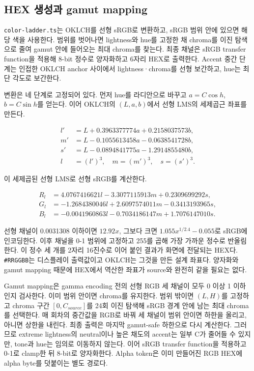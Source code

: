 \documentclass[11pt,titlepage]{article}
\begin{document}
\setlength{\tabcolsep}{6pt}
\normalsize

\subsection{HEX 생성과 gamut mapping}

\texttt{color-ladder.ts}는 OKLCH를 선형 sRGB로 변환하고, sRGB 범위 안에 있으면 해당 색을 사용한다. 범위를 벗어나면 lightness와 hue를 고정한 채 chroma를 이진 탐색으로 줄여 gamut 안에 들어오는 최대 chroma를 찾는다. 최종 채널은 sRGB transfer function을 적용해 8-bit 정수로 양자화하고 6자리 HEX로 출력한다. Accent 중간 단계는 인접한 OKLCH anchor 사이에서 lightness·chroma를 선형 보간하고, hue는 최단 각도로 보간한다\cite{ladder}.

변환은 네 단계로 고정되어 있다. 먼저 hue를 라디안으로 바꾸고 \(a=C\cos h\), \(b=C\sin h\)를 얻는다. 이어 OKLCH의 \((L,a,b)\)에서 선형 LMS의 세제곱근 좌표를 만든다.

\begin{align*}
l' &= L + 0.3963377774a + 0.2158037573b,\\
m' &= L - 0.1055613458a - 0.0638541728b,\\
s' &= L - 0.0894841775a - 1.2914855480b,\\
l &= (l')^3, \quad m=(m')^3, \quad s=(s')^3.
\end{align*}

이 세제곱된 선형 LMS로 선형 sRGB를 계산한다.

\begin{align*}
R_l &= 4.0767416621l - 3.3077115913m + 0.2309699292s,\\
G_l &= -1.2684380046l + 2.6097574011m - 0.3413193965s,\\
B_l &= -0.0041960863l - 0.7034186147m + 1.7076147010s.
\end{align*}

선형 채널이 0.0031308 이하이면 \(12.92x\), 그보다 크면 \(1.055x^{1/2.4}-0.055\)로 sRGB에 인코딩한다. 이후 채널을 0-1 범위에 고정하고 255를 곱해 가장 가까운 정수로 반올림한다. 이 정수 세 개를 2자리 16진수로 이어 붙인 결과가 화면에 전달되는 HEX다. \texttt{\#RRGGBB}는 디스플레이 출력값이고 OKLCH는 그것을 만든 설계 좌표다. 양자화와 gamut mapping 때문에 HEX에서 역산한 좌표가 source와 완전히 같을 필요는 없다.

Gamut mapping은 gamma encoding 전의 선형 RGB 세 채널이 모두 0 이상 1 이하인지 검사한다. 이미 범위 안이면 chroma를 유지한다. 범위 밖이면 \((L,H)\)를 고정하고 chroma 구간 \([0,C_{source}]\)를 24회 이진 탐색해 sRGB 경계 안에 남는 최대 chroma를 선택한다. 매 회차의 중간값을 RGB로 바꿔 세 채널이 범위 안이면 하한을 올리고, 아니면 상한을 내린다. 최종 출력은 마지막 gamut-safe 하한으로 다시 계산한다. 그러므로 extreme lightness의 neutral이나 높은 채도의 accent는 일부 C가 줄어들 수 있지만, tone과 hue는 임의로 이동하지 않는다. 이어 sRGB transfer function을 적용하고 0-1로 clamp한 뒤 8-bit로 양자화한다. Alpha token은 이미 만들어진 RGB HEX에 alpha byte를 덧붙이는 별도 경로다.
\end{document}
